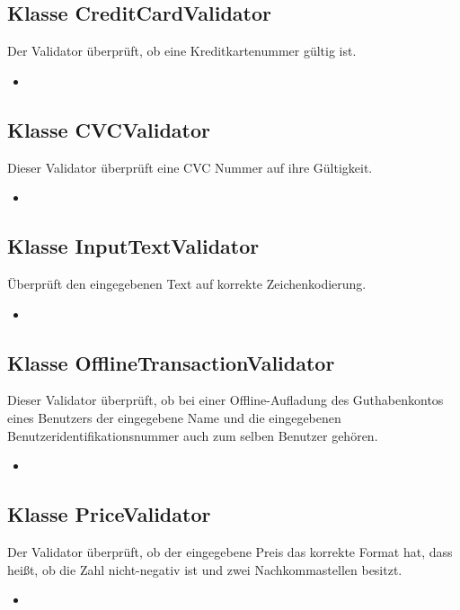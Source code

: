 	\subsection{Klasse CreditCardValidator}
	Der Validator überprüft, ob eine Kreditkartenummer gültig ist.
	\begin{itemize}
		\item \override
	\end{itemize}
	
	\subsection{Klasse CVCValidator}
	Dieser Validator überprüft eine CVC Nummer auf ihre Gültigkeit.
	\begin{itemize}
		\item \override
	\end{itemize}
	
	\subsection{Klasse InputTextValidator}
	Überprüft den eingegebenen Text auf korrekte Zeichenkodierung.
	\begin{itemize}
		\item \override
	\end{itemize}
	
	\subsection{Klasse OfflineTransactionValidator}
	Dieser Validator überprüft, ob bei einer Offline-Aufladung des Guthabenkontos eines Benutzers der eingegebene Name und die eingegebenen Benutzeridentifikationsnummer auch zum selben Benutzer gehören.
	\begin{itemize}
		\item \override
	\end{itemize}
	
	\subsection{Klasse PriceValidator}
	Der Validator überprüft, ob der eingegebene Preis das korrekte Format hat, dass heißt, ob die Zahl nicht-negativ ist und zwei Nachkommastellen besitzt.
	\begin{itemize}
		\item \override
	\end{itemize}
	
